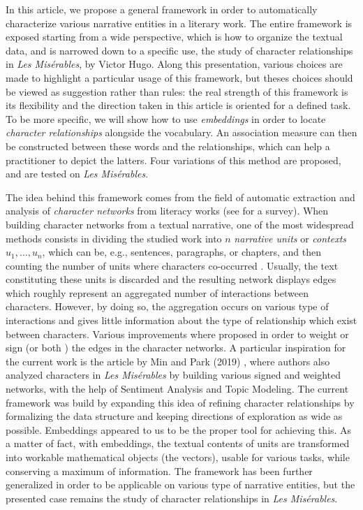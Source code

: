 \documentclass[
twocolumn,
]{ceurart}
\begin{document}
In this article, we propose a general framework in order to automatically characterize various narrative entities in a literary work. The entire framework is exposed starting from a wide perspective, which is how to organize the textual data, and is narrowed down to a specific use, the study of character relationships in \emph{Les Misérables}, by Victor Hugo. Along this presentation, various choices are made to highlight a particular usage of this framework, but theses choices should be viewed as suggestion rather than rules: the real strength of this framework is its flexibility and the direction taken in this article is oriented for a defined task. To be more specific, we will show how to use \emph{embeddings} in order to locate \emph{character relationships} alongside the vocabulary. An association measure can then be constructed between these words and the relationships, which can help a practitioner to depict the latters. Four variations of this method are proposed, and are tested on \emph{Les Misérables}.

The idea behind this framework comes from the field of automatic extraction and analysis of \emph{character networks} from literacy works (see \cite{Labatut2019} for a survey). When building character networks from a textual narrative, one of the most widespread methods consists in dividing the studied work into $n$ \emph{narrative units} or \emph{contexts} $u_1, \ldots, u_n$, which can be, e.g., sentences, paragraphs, or chapters, and then counting the number of units where characters co-occurred \cite{Elsner2012, Lee2012, Rochat2014, Grener2017, Min2019}. Usually, the text constituting these units is discarded and the resulting network displays edges which roughly represent an aggregated number of interactions between characters. However, by doing so, the aggregation occurs on various type of interactions and gives little information about the type of relationship which exist between characters. Various improvements where proposed in order to weight \cite{Sack2014} or sign \cite{Krishnan2015} (or both \cite{Min2019}) the edges in the character networks. A particular inspiration for the current work is the article by Min and Park (2019) \cite{Min2019}, where authors also analyzed characters in \emph{Les Misérables} by building various signed and weighted networks, with the help of Sentiment Analysis and Topic Modeling. The current framework was build by expanding this idea of refining character relationships by formalizing the data structure and keeping directions of exploration as wide as possible. Embeddings \cite{Incitti2023} appeared to us to be the proper tool for achieving this. As a matter of fact, with embeddings, the textual contents of units are transformed into workable mathematical objects (the vectors), usable for various tasks, while conserving a maximum of information. The framework has been further generalized in order to be applicable on various type of narrative entities, but the presented case remains the study of character relationships in \emph{Les Misérables}. 
\end{document}
